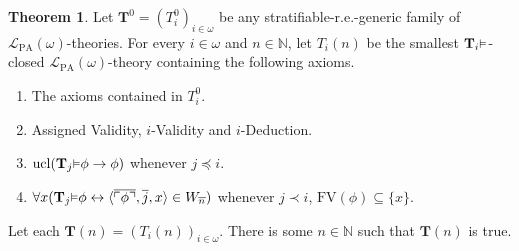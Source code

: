 \documentclass[reqno]{article}
\theoremstyle{definition}
\newtheorem{theorem}{Theorem}
\def\N{\mathbb{N}}
\def\L{\mathscr{L}}
\def\T{\mathbf{T}}
\def\FV{\mathrm{FV}}
\def\LPA{\L_{\mathrm{PA}}}
\renewcommand{\Pr}[1]{\T_{#1}\mbox{\small${\vDash}$}}
\newcommand{\ucl}[1]{\mathrm{ucl}(#1)}
\begin{document}
\begin{theorem}
\label{generalizedtwoonethree}
Let $\T^0=(T^0_i)_{i\in\omega}$ be any
stratifiable-r.e.-generic
family of $\LPA(\omega)$-theories.
For every $i\in\omega$ and $n\in\N$, let $T_i(n)$ be the smallest
$\Pr i$-closed $\LPA(\omega)$-theory containing the following axioms.
\begin{enumerate}
\item The axioms contained in $T^0_i$.
\item Assigned Validity, $i$-Validity and $i$-Deduction.
\item $\ucl{\Pr j\phi\rightarrow\phi}$ whenever $j\preceq i$.
\item $\forall x(\Pr j\phi\leftrightarrow \langle\overline{\ulcorner\phi\urcorner},\overline j,x\rangle\in W_{\overline n})$
whenever $j\prec i$, $\FV(\phi)\subseteq\{x\}$.
\end{enumerate}
Let each $\T(n)=(T_i(n))_{i\in\omega}$.
There is some $n\in\N$ such that $\T(n)$ is true.
\end{theorem}
\end{document}
